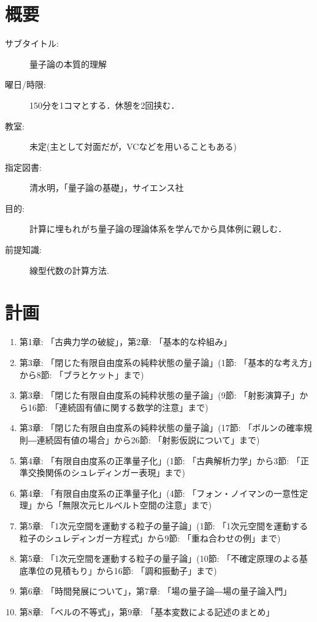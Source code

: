 \documentclass{ltjsarticle}
\begin{document}
  \maketitle
    \section{概要}
    \begin{center}
      \begin{description}
        \item[サブタイトル: ] 量子論の本質的理解
        \item[曜日/時限: ] 150分を1コマとする．休憩を2回挟む．
        \item[教室: ] 未定(主として対面だが，VCなどを用いることもある)
        \item[指定図書: ] 清水明，「量子論の基礎」，サイエンス社
        \item[目的: ] 計算に埋もれがち量子論の理論体系を学んでから具体例に親しむ．
        \item[前提知識: ] 線型代数の計算方法.
      \end{description}
    \end{center}
    \section{計画}
      \begin{enumerate}
        \item 第1章: 「古典力学の破綻」，第2章: 「基本的な枠組み」
        \item 第3章: 「閉じた有限自由度系の純粋状態の量子論」(1節: 「基本的な考え方」から8節: 「ブラとケット」まで)
        \item 第3章: 「閉じた有限自由度系の純粋状態の量子論」(9節: 「射影演算子」から16節: 「連続固有値に関する数学的注意」まで)
        \item 第3章: 「閉じた有限自由度系の純粋状態の量子論」(17節: 「ボルンの確率規則―連続固有値の場合」から26節: 「射影仮説について」まで)
        \item 第4章: 「有限自由度系の正準量子化」(1節: 「古典解析力学」から3節: 「正準交換関係のシュレディンガー表現」まで)
        \item 第4章: 「有限自由度系の正準量子化」(4節: 「フォン・ノイマンの一意性定理」から「無限次元ヒルベルト空間の注意」まで)
        \item 第5章: 「1次元空間を運動する粒子の量子論」(1節: 「1次元空間を運動する粒子のシュレディンガー方程式」から9節: 「重ね合わせの例」まで)
        \item 第5章: 「1次元空間を運動する粒子の量子論」(10節: 「不確定原理のよる基底準位の見積もり」から16節: 「調和振動子」まで)
        \item 第6章: 「時間発展について」，第7章: 「場の量子論―場の量子論入門」
        \item 第8章: 「ベルの不等式」，第9章: 「基本変数による記述のまとめ」
      \end{enumerate}
\end{document}
